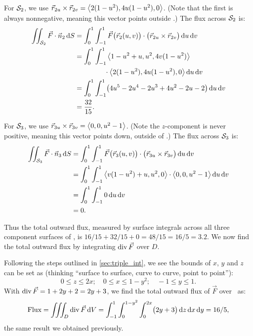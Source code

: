 \begin{example}
For $\mathcal{S}_2$, we use $\vec r_{2u}\times\vec r_{2v} =\left\langle 2(1-u^2), 4u(1-u^2),0\right\rangle$. (Note that the first is always nonnegative, meaning this vector points outside \surfaceS.) The flux across $\mathcal{S}_2$ is:
\begin{align*}
	\iint_{\surfaceS_2} \vec F\cdot \vec n_2\dd S
	&= \int_0^1\int_{-1}^1 \vec F\bigl(\vec r_2(u,v)\bigr)\cdot \bigl(\vec r_{2u}\times\vec r_{2v}\bigr)\dd u\dd v\\
	&= \int_0^1\int_{-1}^1\bracket{1-u^2+u, u^2, 4v(1-u^2)}\\
	&\hphantom{=\int_0^1\int_{-1}^1}\cdot\bracket{2(1-u^2), 4u(1-u^2),0}\dd u\dd v\\
	&= \int_0^1\int_{-1}^1 \bigl(4u^5-2u^4-2u^3+4u^2-2u-2\bigr)\dd u\dd v\\
	&= \frac{32}{15}.
\end{align*}

For $\mathcal{S}_3$, we use $\vec r_{3u}\times\vec r_{3v} =\left\langle 0,0,u^2-1\right\rangle$. (Note the $z$-component is never positive, meaning this vector points down, outside of \surfaceS.) The flux across $\mathcal{S}_3$ is:
\begin{align*}
	\iint_{\mathcal{S}_3} \vec F\cdot \vec n_3\operatorname{d}\! S
	&= \int_0^1\int_{-1}^1 \vec F\bigl(\vec r_3(u,v)\bigr)\cdot \bigl(\vec r_{3u}\times\vec r_{3v}\bigr)\operatorname{d}\! u\operatorname{d}\! v\\
	&= \int_0^1\int_{-1}^1\left\langle v(1-u^2)+u,u^2,0\right\rangle\cdot\left\langle 0,0,u^2-1\right\rangle\operatorname{d}\! u\operatorname{d}\! v\\
	&= \int_0^1\int_{-1}^1 0\operatorname{d}\! u\operatorname{d}\! v\\
	&= 0.
\end{align*}

Thus the total outward flux, measured by surface integrals across all three component surfaces of \surfaceS, is $16/15+32/15+0 = 48/15 = 16/5 = 3.2$. We now find the total outward flux by integrating $\operatorname{div} \vec F$ over $D$.

Following the steps outlined in \autoref{sec:triple_int}, we see the bounds of $x$, $y$ and $z$ can be set as (thinking ``surface to surface, curve to curve, point to point''):
\[0\leq z\leq 2x;\quad 0\leq x\leq 1-y^2;\quad -1\leq y\leq 1.\]
With $\operatorname{div} \vec F = 1+2y+2 = 2y+3$, we find the total outward flux of $\vec F$ over \surfaceS\ as:
\[
\text{Flux} = \iiint_D\operatorname{div} \vec F\operatorname{d}\! V
= \int_{-1}^1\int_0^{1-y^2}\int_0^{2x}\bigl(2y+3\bigr)\operatorname{d}\! z\operatorname{d}\! x\operatorname{d}\! y = 16/5,
\]
the same result we obtained previously.
\end{example}

